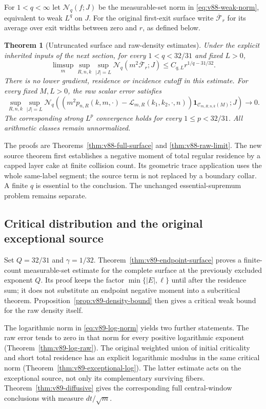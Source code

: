 \documentclass[11pt,reqno]{amsart}
\numberwithin{equation}{section}
\newtheorem{theorem}{Theorem}[section]
\theoremstyle{definition}
\theoremstyle{remark}\newtheorem{remark}[theorem]{Remark}
\newcommand{\one}{\mathbf1}\newcommand{\dd}{\,\mathrm d}
\begin{document}
For $1<q<\infty$ let $\mathcal N_q(f;J)$ be the measurable-set norm
in \eqref{eq:v88-weak-norm}, equivalent to weak $L^q$ on $J$.
For the original first-exit surface write $\overline{\mathcal F}_r$
for its average over exit widths between zero and $r$, as defined below.
\begin{theorem}[Untruncated surface and raw-density estimates]
\label{thm:v88-main}
Under the explicit inherited inputs of the next section, for every
$1<q<32/31$ and fixed $L>0$,
\[
 \limsup_m\sup_{R,n,k}\sup_{|J|=L}
 \mathcal N_q(m^2\overline{\mathcal F}_r;J)
                      \le C_{q,L}r^{1/q-31/32}.
\]
There is no lower gradient, residence or incidence cutoff in this
estimate. For every fixed $M,L>0$, the raw scalar error satisfies
\[
 \sup_{R,n,k}\sup_{|J|=L}
 \mathcal N_q\!\left(
 (m^2p_{n,R}(k,m,\cdot)-\mathcal L_{m,R}(k_1,k_2,\cdot,n))
 \one_{\mathcal C_{m,R,n,k}(M)};J\right)\longrightarrow0.
\]
The corresponding strong $L^p$ convergence holds for every
$1\le p<32/31$. All arithmetic classes remain unnormalized.
\end{theorem}
The proofs are Theorems~\ref{thm:v88-full-surface} and
\ref{thm:v88-raw-limit}. The new source theorem first establishes a
negative moment of total regular residence by a capped layer cake at
finite collision count. Its geometric trace application uses the
whole same-label segment; the source term is not replaced by a
boundary collar. A finite $q$ is essential to the conclusion. The
unchanged essential-supremum problem remains separate.

\subsection{Critical distribution and the original exceptional source}
Set $Q=32/31$ and $\gamma=1/32$. Theorem~\ref{thm:v89-endpoint-surface}
proves a finite-count measurable-set estimate for the complete surface
at the previously excluded exponent $Q$. Its proof keeps the factor
$\min\{|E|,\ell\}$ until after the residence sum; it does not
substitute an endpoint negative moment into a subcritical theorem.
Proposition~\ref{prop:v89-density-bound} then gives a critical weak
bound for the raw density itself.

The logarithmic norm in \eqref{eq:v89-log-norm} yields two further
statements. The raw error tends to zero in that norm for every
positive logarithmic exponent (Theorem~\ref{thm:v89-log-raw}).
The original weighted union of initial criticality and short total
residence has an explicit logarithmic modulus in the same critical
norm (Theorem~\ref{thm:v89-exceptional-log}). The latter estimate
acts on the exceptional source, not only its complementary surviving
fibers. Theorem~\ref{thm:v89-diffusive} gives the corresponding full
central-window conclusions with measure $dt/\sqrt m$.
\end{document}
